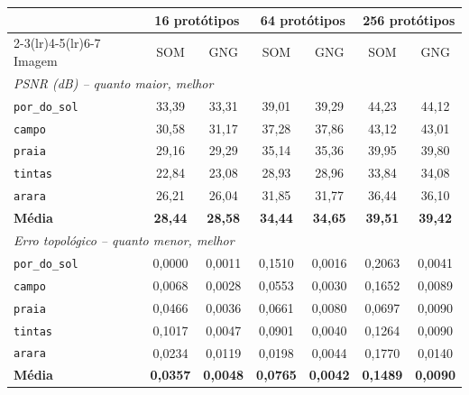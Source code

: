 \begin{tabular}{lcccccc}
\toprule
 & \multicolumn{2}{c}{16 protótipos} & \multicolumn{2}{c}{64 protótipos} & \multicolumn{2}{c}{256 protótipos} \\
\cmidrule(lr){2-3}\cmidrule(lr){4-5}\cmidrule(lr){6-7}
Imagem & SOM & GNG & SOM & GNG & SOM & GNG \\
\midrule
\multicolumn{7}{l}{\textit{PSNR (dB) -- quanto maior, melhor}} \\
\texttt{por\_do\_sol} & 33{,}39 & 33{,}31 & 39{,}01 & 39{,}29 & 44{,}23 & 44{,}12 \\
\texttt{campo} & 30{,}58 & 31{,}17 & 37{,}28 & 37{,}86 & 43{,}12 & 43{,}01 \\
\texttt{praia} & 29{,}16 & 29{,}29 & 35{,}14 & 35{,}36 & 39{,}95 & 39{,}80 \\
\texttt{tintas} & 22{,}84 & 23{,}08 & 28{,}93 & 28{,}96 & 33{,}84 & 34{,}08 \\
\texttt{arara} & 26{,}21 & 26{,}04 & 31{,}85 & 31{,}77 & 36{,}44 & 36{,}10 \\
\textbf{Média} & \textbf{28{,}44} & \textbf{28{,}58} & \textbf{34{,}44} & \textbf{34{,}65} & \textbf{39{,}51} & \textbf{39{,}42} \\
\midrule
\multicolumn{7}{l}{\textit{Erro topológico -- quanto menor, melhor}} \\
\texttt{por\_do\_sol} & 0{,}0000 & 0{,}0011 & 0{,}1510 & 0{,}0016 & 0{,}2063 & 0{,}0041 \\
\texttt{campo} & 0{,}0068 & 0{,}0028 & 0{,}0553 & 0{,}0030 & 0{,}1652 & 0{,}0089 \\
\texttt{praia} & 0{,}0466 & 0{,}0036 & 0{,}0661 & 0{,}0080 & 0{,}0697 & 0{,}0090 \\
\texttt{tintas} & 0{,}1017 & 0{,}0047 & 0{,}0901 & 0{,}0040 & 0{,}1264 & 0{,}0090 \\
\texttt{arara} & 0{,}0234 & 0{,}0119 & 0{,}0198 & 0{,}0044 & 0{,}1770 & 0{,}0140 \\
\textbf{Média} & \textbf{0{,}0357} & \textbf{0{,}0048} & \textbf{0{,}0765} & \textbf{0{,}0042} & \textbf{0{,}1489} & \textbf{0{,}0090} \\
\bottomrule
\end{tabular}
